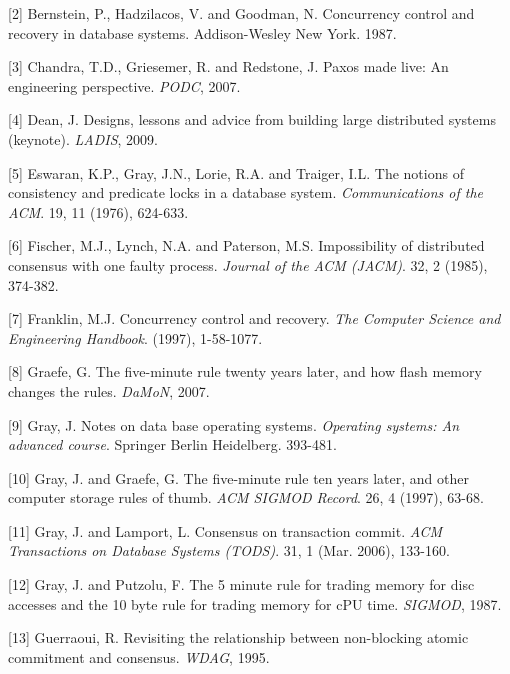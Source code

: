 \documentclass[b5paper,11pt,twoside,openright]{book}
\begin{document}
\leavevmode\hypertarget{ref-bernstein-book}{}%
{[}2{]} Bernstein, P., Hadzilacos, V. and Goodman, N. Concurrency
control and recovery in database systems. Addison-Wesley New York. 1987.

\leavevmode\hypertarget{ref-multipaxos}{}%
{[}3{]} Chandra, T.D., Griesemer, R. and Redstone, J. Paxos made live:
An engineering perspective. \emph{PODC}, 2007.

\leavevmode\hypertarget{ref-google-numbers}{}%
{[}4{]} Dean, J. Designs, lessons and advice from building large
distributed systems (keynote). \emph{LADIS}, 2009.

\leavevmode\hypertarget{ref-eswaran76}{}%
{[}5{]} Eswaran, K.P., Gray, J.N., Lorie, R.A. and Traiger, I.L. The
notions of consistency and predicate locks in a database system.
\emph{Communications of the ACM}. 19, 11 (1976), 624-633.

\leavevmode\hypertarget{ref-flp}{}%
{[}6{]} Fischer, M.J., Lynch, N.A. and Paterson, M.S. Impossibility of
distributed consensus with one faulty process. \emph{Journal of the ACM
  (JACM)}. 32, 2 (1985), 374-382.

\leavevmode\hypertarget{ref-franklin-aries}{}%
{[}7{]} Franklin, M.J. Concurrency control and recovery. \emph{The
  Computer Science and Engineering Handbook}. (1997), 1-58-1077.

\leavevmode\hypertarget{ref-five-twenty}{}%
{[}8{]} Graefe, G. The five-minute rule twenty years later, and how
flash memory changes the rules. \emph{DaMoN}, 2007.

\leavevmode\hypertarget{ref-gray-2pc}{}%
{[}9{]} Gray, J. Notes on data base operating systems. \emph{Operating
  systems: An advanced course}. Springer Berlin Heidelberg. 393-481.

\leavevmode\hypertarget{ref-five-ten}{}%
{[}10{]} Gray, J. and Graefe, G. The five-minute rule ten years later,
and other computer storage rules of thumb. \emph{ACM SIGMOD Record}. 26,
4 (1997), 63-68.

\leavevmode\hypertarget{ref-paxoscommit}{}%
{[}11{]} Gray, J. and Lamport, L. Consensus on transaction commit.
\emph{ACM Transactions on Database Systems (TODS)}. 31, 1 (Mar. 2006),
133-160.

\leavevmode\hypertarget{ref-fiveminute}{}%
{[}12{]} Gray, J. and Putzolu, F. The 5 minute rule for trading memory
for disc accesses and the 10 byte rule for trading memory for cPU time.
\emph{SIGMOD}, 1987.

\leavevmode\hypertarget{ref-ac-consensus}{}%
{[}13{]} Guerraoui, R. Revisiting the relationship between non-blocking
atomic commitment and consensus. \emph{WDAG}, 1995.
\end{document}
